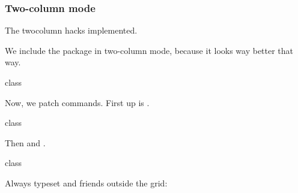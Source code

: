 \documentclass{skdoc}
\begin{document}
	\subsubsection{Two-column mode}
	The twocolumn hacks implemented.
\begin{MacroCode}{class}
\ifskrapport@twocolumn
	\AtBeginDocument{
\end{MacroCode}
	We include the  package in two-column mode, because
	it looks way better that way.
\begin{MacroCode}{class}
		\IfStrEq{\skrapport@ptsize}{10pt}{
			\RequirePackage[fontsize=10pt,baseline=12pt]{grid}
		}{
			\IfStrEq{\skrapport@ptsize}{11pt}{
				\RequirePackage[fontsize=11pt,baseline=13.2pt]{grid}
			}{
				\RequirePackage[fontsize=12pt,baseline=14.4pt]{grid}
			}	
		}
\end{MacroCode}
	Now, we patch commands. First up is .
\begin{MacroCode}{class}
		\renewenvironment{abstract}{\section*{\abstractname}}{}
\end{MacroCode}
	Then  and .
\begin{MacroCode}{class}
		\AtEndDocument{\end{multicols}}
		\pretocmd{\maketitle}{\end{multicols}}{}{}
\end{MacroCode}
	Always typeset  and friends outside the grid:
\end{document}
